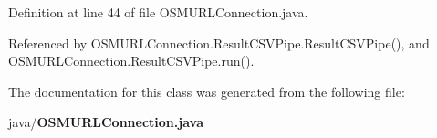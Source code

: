 Definition at line 44 of file O\+S\+M\+U\+R\+L\+Connection.\+java.



Referenced by O\+S\+M\+U\+R\+L\+Connection.\+Result\+C\+S\+V\+Pipe.\+Result\+C\+S\+V\+Pipe(), and O\+S\+M\+U\+R\+L\+Connection.\+Result\+C\+S\+V\+Pipe.\+run().



The documentation for this class was generated from the following file\+:\begin{DoxyCompactItemize}
\item 
java/{\bf O\+S\+M\+U\+R\+L\+Connection.\+java}\end{DoxyCompactItemize}
